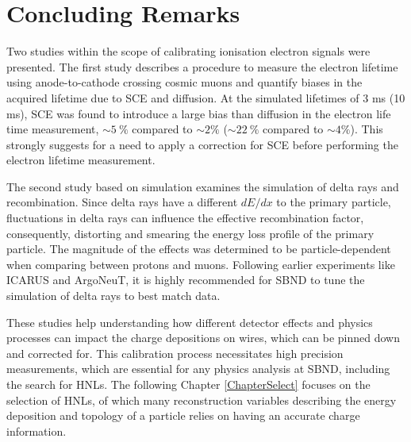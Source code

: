 \section{Concluding Remarks}
\label{sec:concludeDeltaRay}

Two studies within the scope of calibrating ionisation electron signals were presented. 
The first study describes a procedure to measure the electron lifetime using anode-to-cathode crossing cosmic muons and quantify biases in the acquired lifetime due to SCE and diffusion. 
At the simulated lifetimes of 3 ms (10 ms), SCE was found to introduce a large bias than diffusion in the electron life time measurement, $\sim5~\%$ compared to $\sim2\%$ ($\sim22~\%$ compared to $\sim4\%$).
This strongly suggests for a need to apply a correction for SCE before performing the electron lifetime measurement. 

The second study based on simulation examines the simulation of delta rays and recombination.
Since delta rays have a different $dE/dx$ to the primary particle, fluctuations in delta rays can influence the effective recombination factor, consequently, distorting and smearing the energy loss profile of the primary particle.
The magnitude of the effects was determined to be particle-dependent when comparing between protons and muons.
Following earlier experiments like ICARUS and ArgoNeuT, it is highly recommended for SBND to tune the simulation of delta rays to best match data.

These studies help understanding how different detector effects and physics processes can impact the charge depositions on wires, which can be pinned down and corrected for.
This calibration process necessitates high precision measurements, which are essential for any physics analysis at SBND, including the search for HNLs.
The following Chapter \ref{ChapterSelect} focuses on the selection of HNLs, of which many reconstruction variables describing the energy deposition and topology of a particle relies on having an accurate charge information. 

